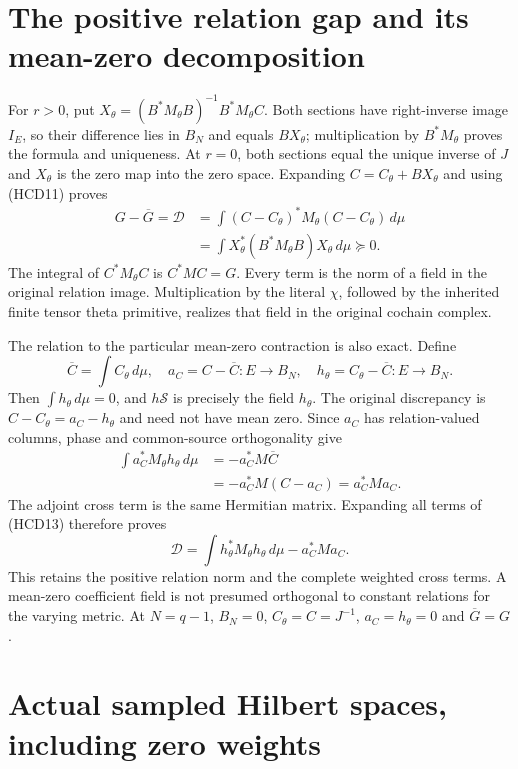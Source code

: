 \documentclass[11pt]{article}
\begin{document}
\section{The positive relation gap and its mean-zero decomposition}

For $r>0$, put
$X_\theta=(B^*M_\theta B)^{-1}B^*M_\theta C$.
Both sections have right-inverse image $I_E$, so their difference
lies in $B_N$ and equals $BX_\theta$; multiplication by
$B^*M_\theta$ proves the formula and uniqueness.
At $r=0$, both sections equal the unique inverse of $J$ and
$X_\theta$ is the zero map into the zero space.
Expanding $C=C_\theta+BX_\theta$ and using (HCD11) proves
\[
 \boxed{
 \begin{aligned}
 G-\overline G=\mathscr D
 &=\int(C-C_\theta)^*M_\theta(C-C_\theta)\,d\mu\\
 &=\int X_\theta^*(B^*M_\theta B)X_\theta\,d\mu\succeq0.
 \end{aligned}}
 \tag{HCD13}
\]
The integral of $C^*M_\theta C$ is $C^*MC=G$.
Every term is the norm of a field in the original relation
image. Multiplication by the literal $\chi$, followed by
the inherited finite tensor theta primitive, realizes
that field in the original cochain complex.

The relation to the particular mean-zero contraction is also exact.
Define
\[
 \overline C=\int C_\theta\,d\mu,\quad
 a_C=C-\overline C:E\to B_N,\quad
 h_\theta=C_\theta-\overline C:E\to B_N.
 \tag{HCD14}
\]
Then $\int h_\theta\,d\mu=0$, and $h\mathscr S$ is precisely
the field $h_\theta$. The original discrepancy is
$C-C_\theta=a_C-h_\theta$ and need not have mean zero.
Since $a_C$ has relation-valued columns, phase and
common-source orthogonality give
\[
 \begin{split}
 \int a_C^*M_\theta h_\theta\,d\mu
 &=-a_C^*M\overline C\\
 &=-a_C^*M(C-a_C)=a_C^*Ma_C.
 \end{split}
 \tag{HCD15}
\]
The adjoint cross term is the same Hermitian matrix.
Expanding all terms of (HCD13) therefore proves
\[
 \boxed{\mathscr D
 =\int h_\theta^*M_\theta h_\theta\,d\mu-a_C^*Ma_C.}
 \tag{HCD16}
\]
This retains the positive relation norm and the complete
weighted cross terms. A mean-zero coefficient field is
not presumed orthogonal to constant relations for the
varying metric. At $N=q-1$, $B_N=0$,
$C_\theta=C=J^{-1}$, $a_C=h_\theta=0$ and $\overline G=G$.

\section{Actual sampled Hilbert spaces, including zero weights}
\end{document}
